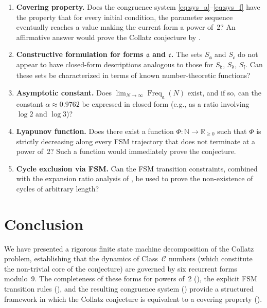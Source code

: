 \documentclass[11pt,a4paper]{article}
\theoremstyle{plain}
\theoremstyle{definition}
\newcommand{\N}{\mathbb{N}}
\DeclareMathOperator{\Freq}{Freq}
\begin{document}
\begin{enumerate}[label=\textbf{Q\arabic*.}]
  \item \textbf{Covering property.} Does the congruence system \eqref{eq:sys_a}--\eqref{eq:sys_f} have the property that for every initial condition, the parameter sequence eventually reaches a value making the current form a power of~2? An affirmative answer would prove the Collatz conjecture by .

  \item \textbf{Constructive formulation for forms $\mathfrak{a}$ and $\mathfrak{c}$.} The sets $S_{\mathfrak{a}}$ and $S_{\mathfrak{c}}$ do not appear to have closed-form descriptions analogous to those for $S_{\mathfrak{b}}$, $S_{\mathfrak{d}}$, $S_{\mathfrak{f}}$. Can these sets be characterized in terms of known number-theoretic functions?

  \item \textbf{Asymptotic constant.} Does $\lim_{N \to \infty} \Freq_{\mathfrak{a}}(N)$ exist, and if so, can the constant $\alpha \approx 0.9762$ be expressed in closed form (e.g., as a ratio involving $\log 2$ and $\log 3$)?

  \item \textbf{Lyapunov function.} Does there exist a function $\Phi: \N \to \mathbb{R}_{\geq 0}$ such that $\Phi$ is strictly decreasing along every FSM trajectory that does not terminate at a power of~2? Such a function would immediately prove the conjecture.

  \item \textbf{Cycle exclusion via FSM.} Can the FSM transition constraints, combined with the expansion ratio analysis of , be used to prove the non-existence of cycles of arbitrary length?
\end{enumerate}

\section{Conclusion}
\label{sec:conclusion}

We have presented a rigorous finite state machine decomposition of the Collatz problem, establishing that the dynamics of Class~$\mathcal{C}$ numbers (which constitute the non-trivial core of the conjecture) are governed by six recurrent forms modulo~9. The completeness of these forms for powers of~2 (), the explicit FSM transition rules (), and the resulting congruence system () provide a structured framework in which the Collatz conjecture is equivalent to a covering property ().
\end{document}
